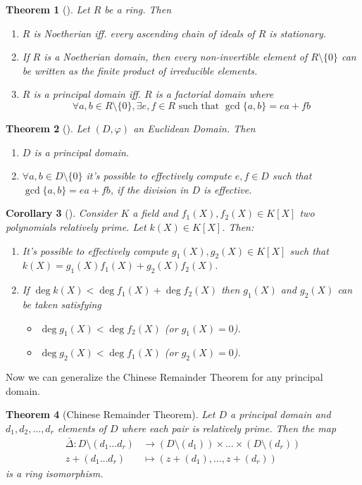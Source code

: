 \documentclass[12pt,a4paper]{article}
\newtheorem{theorem}{Theorem}[section]
\newtheorem{corollary}[theorem]{Corollary}
\theoremstyle{definition}
\begin{document}
\begin{theorem}[]
Let $R$ be a ring. Then
\begin{enumerate}
\item $R$ is Noetherian iff. every ascending chain of ideals of $R$ is stationary.
\item If $R$ is a Noetherian domain, then every non-invertible element of $R \setminus \{0 \}$ can be written as the finite product of irreducible elements.
\item $R$ is a principal domain iff. $R$ is a factorial domain where 
\[
\forall a, b \in R \setminus \{ 0 \}, \exists e,f \in R \text{ such that } \gcd \{ a,b\} = ea+fb
\]
\end{enumerate}
\end{theorem} 

\begin{theorem}[]
Let $(D, \varphi)$ an Euclidean Domain. Then
\begin{enumerate}
\item $D$ is a principal domain.
\item $\forall a,b \in D \setminus \{ 0 \}$ it's possible to effectively compute $e, f \in D$ such that $\gcd \{ a,b \}  = ea+fb$, if the division in $D$ is effective.
\end{enumerate}
\end{theorem}

\begin{corollary}[]
Consider $K$ a field and $f_1(X), f_2(X) \in K[X]$ two polynomials relatively prime. Let $k(X)\in K[X]$. Then:
\begin{enumerate}
\item It's possible to effectively compute $g_1(X), g_2(X) \in K[X]$ such that $k(X) = g_1(X)f_1(X)+g_2(X)f_2(X)$.
\item If $\deg k(X) < \deg f_1(X) + \deg f_2(X)$ then $g_1(X)$ and $g_2(X)$ can be taken satisfying
\begin{itemize}
\item $\deg g_1(X) < \deg f_2(X)$ (or $g_1(X) = 0$).
\item $\deg g_2(X) < \deg f_1(X)$ (or $g_2(X) = 0$).
\end{itemize}
\end{enumerate}
\end{corollary}

Now we can generalize the Chinese Remainder Theorem for any principal domain.

\begin{theorem}[Chinese Remainder Theorem]
Let $D$ a principal domain and $d_1, d_2, \ldots, d_r$ elements of $D$ where each pair is relatively prime. Then the map
\begin{equation*}
\begin{aligned}
\bar{\Delta}: D \setminus (d_1 \ldots d_r) & \to (D \setminus (d_1)) \times \ldots \times (D \setminus (d_r)) \\
z + (d_1 \ldots d_r) & \mapsto (z + (d_1), \ldots, z + (d_r))
\end{aligned}
\end{equation*}
is a ring isomorphism.
\end{theorem}
\end{document}
